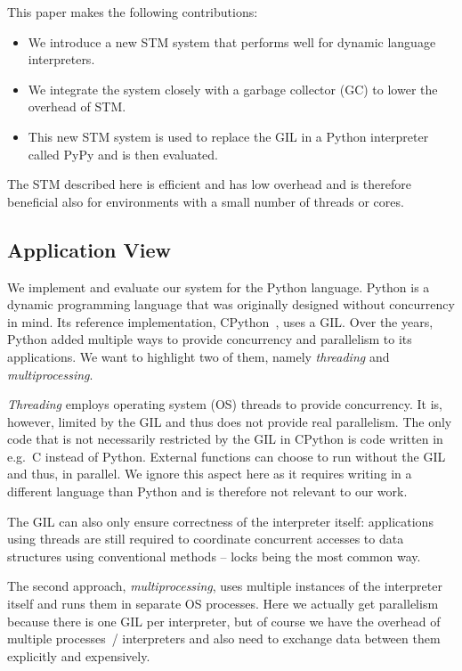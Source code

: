 \documentclass{sigplanconf}
\begin{document}
This paper makes the following contributions:
\begin{itemize}
\item We introduce a new STM system that performs well for dynamic
  language interpreters.
\vspace{3mm}               %
\item We integrate the system closely with a garbage collector
  (GC) to lower the overhead of STM.
\item This new STM system is used to replace the GIL in a Python
  interpreter called PyPy and is then evaluated.
\end{itemize}

The STM described here is efficient and has low overhead and is
therefore beneficial also for environments with a small number of
threads or cores.

\subsection{Application View}

We implement and evaluate our system for the Python language. Python
is a dynamic programming language that was originally designed without
concurrency in mind.
Its reference implementation, CPython~\cite{cpython}, uses a
GIL. Over the years, Python added multiple ways to provide concurrency and
parallelism to its applications. We want to highlight two of them,
namely \emph{threading} and \emph{multiprocessing}.

\emph{Threading} employs operating system (OS) threads to provide
concurrency. It is, however, limited by the GIL and thus does not
provide real parallelism.
The only code that is not necessarily restricted by the GIL in CPython
is code written in e.g.\ C instead of Python. External functions can
choose to run without the GIL and thus, in parallel. We ignore this
aspect here as it requires writing in a different language than Python
and is therefore not relevant to our work.

The GIL can also
only ensure correctness of the interpreter itself: applications using
threads are still
required to coordinate concurrent accesses to data structures using
conventional methods -- locks being the most common way.

The second approach, \emph{multiprocessing}, uses multiple instances
of the interpreter itself and runs them in separate OS processes.
Here we actually get parallelism because there is one GIL per
interpreter, but of course we have the overhead of multiple processes~/
interpreters and also need to exchange data between them explicitly
and expensively.
\end{document}
